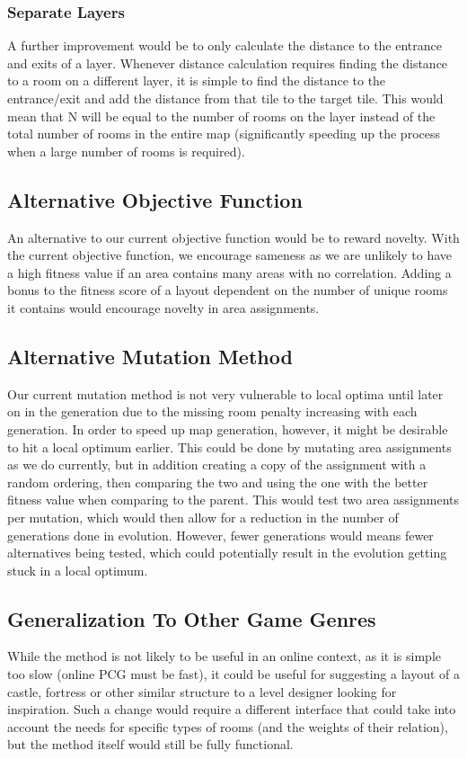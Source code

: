 \subsubsection{Separate Layers}
A further improvement would be to only calculate the distance to the entrance and exits of a layer. Whenever distance calculation requires finding the distance to a room on a different layer, it is simple to find the distance to the entrance/exit and add the distance from that tile to the target tile. This would mean that N will be equal to the number of rooms on the layer instead of the total number of rooms in the entire map (significantly speeding up the process when a large number of rooms is required).

\subsection{Alternative Objective Function}
\label{06_AlternateObjective}
An alternative to our current objective function would be to reward novelty. With the current objective function, we encourage sameness as we are unlikely to have a high fitness value if an area contains many areas with no correlation. Adding a bonus to the fitness score of a layout dependent on the number of unique rooms it contains would encourage novelty in area assignments.

\subsection{Alternative Mutation Method}
\label{06_AlternateMutation}
Our current mutation method is not very vulnerable to local optima until later on in the generation due to the missing room penalty increasing with each generation. In order to speed up map generation, however, it might be desirable to hit a local optimum earlier. This could be done by mutating area assignments as we do currently, but in addition creating a copy of the assignment with a random ordering, then comparing the two and using the one with the better fitness value when comparing to the parent. This would test two area assignments per mutation, which would then allow for a reduction in the number of generations done in evolution. However, fewer generations would means fewer alternatives being tested, which could potentially result in the evolution getting stuck in a local optimum.

\subsection{Generalization To Other Game Genres}
\label{06_Generalization}
While the method is not likely to be useful in an online context, as it is simple too slow (online PCG must be fast\cite{togelius2011search}), it could be useful for suggesting a layout of a castle, fortress or other similar structure to a level designer looking for inspiration. Such a change would require a different interface that could take into account the needs for specific types of rooms (and the weights of their relation), but the method itself would still be fully functional.

